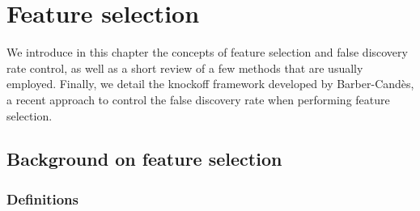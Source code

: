 \chapter{Feature selection}\label{ch:fs}

We introduce in this chapter the concepts of feature selection and false discovery rate control,
as well as a short review of a few methods that are usually employed.
Finally, we detail the knockoff framework developed by Barber-Candès,
a recent approach to control the false discovery rate when performing feature selection.

\section{Background on feature selection}\label{sec:bfs}

\subsection{Definitions}\label{subsec:fs_defs}

